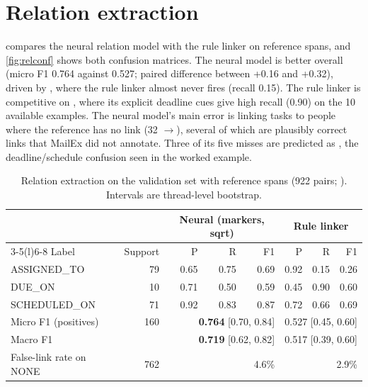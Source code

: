 \section{Relation extraction}
\label{sec:resrel}
 compares the neural relation model with the rule linker on reference spans, and \cref{fig:relconf} shows both confusion matrices. The neural model is better overall (micro F1 0.764 against 0.527; paired difference between +0.16 and +0.32), driven by , where the rule linker almost never fires (recall 0.15). The rule linker is competitive on , where its explicit deadline cues give high recall (0.90) on the 10 available examples. The neural model's main error is linking tasks to people where the reference has no link (32 $\to$), several of which are plausibly correct links that MailEx did not annotate. Three of its five  misses are predicted as , the deadline/schedule confusion seen in the worked example.

\begin{table}[h]
\centering
\caption[Relation extraction results]{Relation extraction on the validation set with reference spans (922 pairs; ). Intervals are thread-level bootstrap.}
\label{tab:resrel}
\footnotesize
\begin{tabular}{@{}lrrrrrrr@{}}
\toprule
 & & \multicolumn{3}{c}{Neural (markers, sqrt)} & \multicolumn{3}{c}{Rule linker} \\
\cmidrule(lr){3-5}\cmidrule(l){6-8}
Label & Support & P & R & F1 & P & R & F1 \\
\midrule
ASSIGNED\_TO & 79 & 0.65 & 0.75 & 0.69 & 0.92 & 0.15 & 0.26 \\
DUE\_ON & 10 & 0.71 & 0.50 & 0.59 & 0.45 & 0.90 & 0.60 \\
SCHEDULED\_ON & 71 & 0.92 & 0.83 & 0.87 & 0.72 & 0.66 & 0.69 \\
\midrule
Micro F1 (positives) & 160 & \multicolumn{3}{r}{\textbf{0.764} [0.70, 0.84]} & \multicolumn{3}{r}{0.527 [0.45, 0.60]} \\
Macro F1 & & \multicolumn{3}{r}{\textbf{0.719} [0.62, 0.82]} & \multicolumn{3}{r}{0.517 [0.39, 0.60]} \\
False-link rate on NONE & 762 & \multicolumn{3}{r}{4.6\%} & \multicolumn{3}{r}{2.9\%} \\
\bottomrule
\end{tabular}
\end{table}

